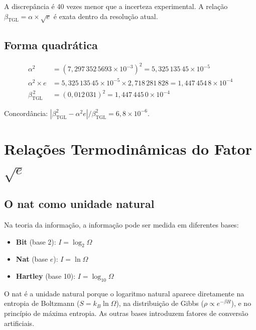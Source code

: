 \documentclass[12pt,a4paper,twoside]{article}
\newcommand{\betatgl}{\beta_{\!\scriptscriptstyle\mathrm{TGL}}}
\begin{document}
A discrepância é 40 vezes menor que a incerteza experimental. A relação $\betatgl = \alpha \times \sqrt{e}$ é exata dentro da resolução atual.

\subsection{Forma quadrática}

\begin{align}
\alpha^2 &= (7{,}297\,352\,5693 \times 10^{-3})^2 = 5{,}325\,135\,45 \times 10^{-5} \\
\alpha^2 \times e &= 5{,}325\,135\,45 \times 10^{-5} \times 2{,}718\,281\,828 = 1{,}447\,454\,8 \times 10^{-4} \\
\betatgl^{\,2} &= (0{,}012\,031)^2 = 1{,}447\,445\,0 \times 10^{-4}
\end{align}

Concordância: $|\betatgl^2 - \alpha^2 e|/\betatgl^2 = 6{,}8 \times 10^{-6}$.



\section{Relações Termodinâmicas do Fator $\sqrt{e}$}
\label{app:termodinamica}

\subsection{O nat como unidade natural}

Na teoria da informação, a informação pode ser medida em diferentes bases:

\begin{itemize}[nosep]
\item \textbf{Bit} (base 2): $I = \log_2 \Omega$
\item \textbf{Nat} (base $e$): $I = \ln \Omega$
\item \textbf{Hartley} (base 10): $I = \log_{10} \Omega$
\end{itemize}

O nat é a unidade natural porque o logaritmo natural aparece diretamente na entropia de Boltzmann ($S = k_B \ln \Omega$), na distribuição de Gibbs ($\rho \propto e^{-\beta H}$), e no princípio de máxima entropia. As outras bases introduzem fatores de conversão artificiais.
\end{document}

